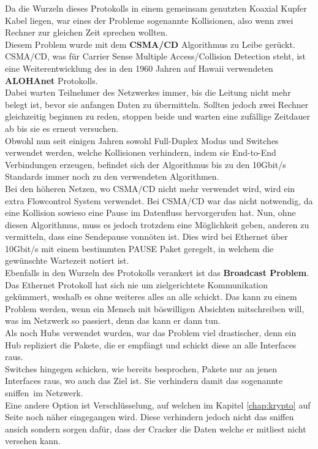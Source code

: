 \documentclass[12pt,a4paper]{report}
\begin{document}
\begin{onehalfspace}
Da die Wurzeln dieses Protokolls in einem gemeinsam genutzten Koaxial Kupfer Kabel liegen, war eines der Probleme sogenannte Kollisionen, also wenn zwei Rechner zur gleichen Zeit sprechen wollten.\\
Diesem Problem wurde mit dem \textbf{CSMA/CD} Algorithmus zu Leibe gerückt. CSMA/CD, was für Carrier Sense Multiple Access/Collision Detection steht, ist eine Weiterentwicklung des in den 1960 Jahren auf Hawaii verwendeten \textbf{ALOHAnet} Protokolls.\\
Dabei warten Teilnehmer des Netzwerkes immer, bis die Leitung nicht mehr belegt ist, bevor sie anfangen Daten zu übermitteln. Sollten jedoch zwei Rechner gleichzeitig beginnen zu reden, stoppen beide und warten eine zufällige Zeitdauer ab bis sie es erneut versuchen.\\
Obwohl nun seit einigen Jahren sowohl Full-Duplex Modus und Switches verwendet werden, welche Kollisionen verhindern, indem sie End-to-End Verbindungen erzeugen, befindet sich der Algorithmus bis zu den 10Gbit/s Standards immer noch zu den verwendeten Algorithmen.\\
Bei den höheren Netzen, wo CSMA/CD nicht mehr verwendet wird, wird ein extra Flowcontrol System verwendet. Bei CSMA/CD war das nicht notwendig, da eine Kollision sowieso eine Pause im Datenfluss hervorgerufen hat. Nun, ohne diesen Algorithmus, muss es jedoch trotzdem eine Möglichkeit geben, anderen zu vermitteln, dass eine Sendepause vonnöten ist. Dies wird bei Ethernet über 10Gbit/s mit einem bestimmten PAUSE Paket geregelt, in welchem die gewünschte Wartezeit notiert ist.\\

Ebenfalls in den Wurzeln des Protokolls verankert ist das \textbf{Broadcast Problem}.\\
Das Ethernet Protokoll hat sich nie um zielgerichtete Kommunikation gekümmert, weshalb es ohne weiteres alles an alle schickt. Das kann zu einem Problem werden, wenn ein Mensch mit böswilligen Absichten mitschreiben will, was im Netzwerk so passiert, denn das kann er dann tun.\\
Als noch Hubs verwendet wurden, war das Problem viel drastischer, denn ein Hub repliziert die Pakete, die er empfängt und schickt diese an alle Interfaces raus.\\
Switches hingegen schicken, wie bereits besprochen, Pakete nur an jenen Interfaces raus, wo auch das Ziel ist. Sie verhindern damit das sogenannte \glqq sniffen\grqq \ im Netzwerk.\\
Eine andere Option ist Verschlüsselung, auf welchen im Kapitel \ref{chap:krypto} auf Seite \pageref{chap:krypto} noch näher eingegangen wird. Diese verhindern jedoch nicht das sniffen ansich sondern sorgen dafür, dass der Cracker die Daten welche er mitliest nicht versehen kann.\\


\end{onehalfspace}
\end{document}
